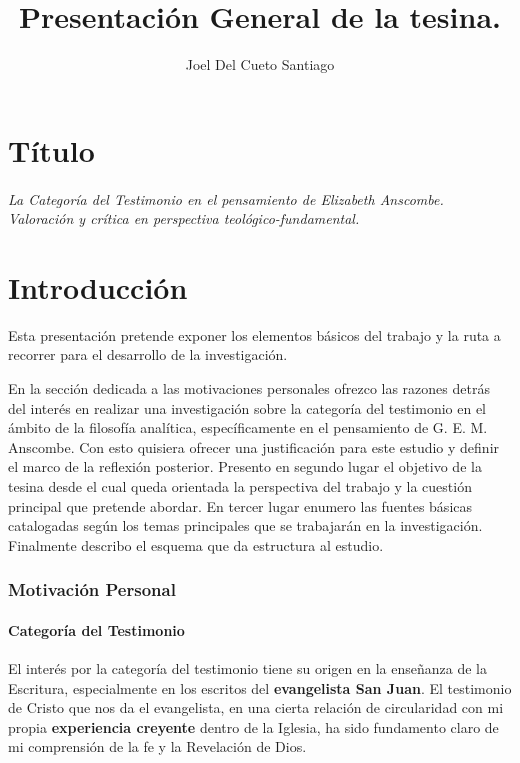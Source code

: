 \documentclass[11pt]{article}
\title{Presentación General de la tesina.}
\author{Joel Del Cueto Santiago}
\begin{document}
\maketitle

\part*{Título}
\paragraph{\noindent La Categoría del Testimonio en el pensamiento de Elizabeth Anscombe.\\
\emph{Valoración y crítica en perspectiva teológico-fundamental.}}

\part*{Introducción}

Esta presentación pretende exponer los elementos básicos del trabajo y la ruta a recorrer para el desarrollo de la investigación.

En la sección dedicada a las motivaciones personales ofrezco las razones detrás del interés en realizar una investigación sobre la categoría del testimonio en el ámbito de la filosofía analítica, específicamente en el pensamiento de G. E. M. Anscombe. Con esto quisiera ofrecer una justificación para este estudio y definir el marco de la reflexión posterior. Presento en segundo lugar el objetivo de la tesina desde el cual queda orientada la perspectiva del trabajo y la cuestión principal que pretende abordar. En tercer lugar enumero las fuentes básicas catalogadas según los temas principales que se trabajarán en la investigación. Finalmente describo el esquema que da estructura al estudio.

\section{Motivación Personal}

\subsection{Categoría del Testimonio}

El interés por la categoría del testimonio tiene su origen en la enseñanza de la Escritura, especialmente en los escritos del \textbf{evangelista San Juan}. El testimonio de Cristo que nos da el evangelista, en una cierta relación de circularidad con mi propia \textbf{experiencia creyente} dentro de la Iglesia, ha sido fundamento claro de mi comprensión de la fe y la Revelación de Dios.
\end{document}
